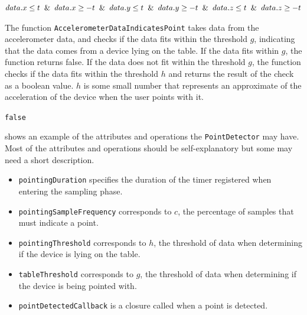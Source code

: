 \begin{algorithm}
  \begin{algorithmic}
      \State \Return $data.x \leq t \And data.x \geq -t \And data.y \leq t \And data.y \geq -t \And data.z \leq t \And data.z \geq -t$
    \EndFunction
  \end{algorithmic}
\end{algorithm}

The function \texttt{AccelerometerDataIndicatesPoint} takes data from the accelerometer data, 
and checks if the data fits within the threshold $g$, 
indicating that the data comes from a device lying on the table. 
If the data fits within $g$, 
the function returns false. 
If the data does not fit within the threshold $g$, the function checks if the data fits within the threshold $h$ and returns the result of the check as a boolean value. $h$ is some small number that represents an approximate of the acceleration of the device when the user points with it.

\begin{algorithm}
  \begin{algorithmic}
    \State \Return \texttt{false}
    \Else
    \State \Return {}
    \EndIf
    \EndFunction
  \end{algorithmic}
\end{algorithm}

 shows an example of the attributes and operations the \texttt{PointDetector} may have. 
Most of the attributes and operations should be self-explanatory but some may need a short description.

\begin{itemize}
  \item \texttt{pointingDuration} specifies the duration of the timer registered when entering the sampling phase.
  \item \texttt{pointingSampleFrequency} corresponds to $c$, the percentage of samples that must indicate a point.
  \item \texttt{pointingThreshold} corresponds to $h$, the threshold of data when determining if the device is lying on the table.
  \item \texttt{tableThreshold} corresponds to $g$, the threshold of data when determining if the device is being pointed with.
  \item \texttt{pointDetectedCallback} is a closure called when a point is detected.
\end{itemize}

